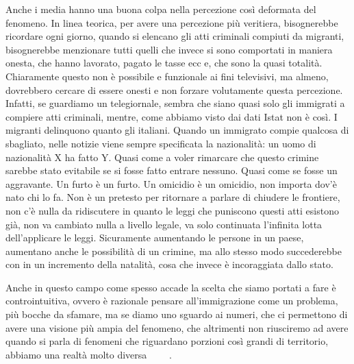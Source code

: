 \documentclass[12pt]{book} %
\begin{document}
Anche i media hanno una buona colpa nella percezione così deformata del fenomeno. In linea teorica, per avere una
percezione più veritiera, bisognerebbe ricordare ogni giorno, quando si elencano gli atti criminali compiuti da
migranti, bisognerebbe menzionare tutti quelli che invece si sono comportati in maniera onesta, che hanno lavorato,
pagato le tasse ecc e, che sono la quasi totalità. Chiaramente questo non è possibile e funzionale ai fini televisivi,
ma almeno, dovrebbero cercare di essere onesti e non forzare volutamente questa percezione. Infatti, se guardiamo un
telegiornale, sembra che siano quasi solo gli immigrati a compiere atti criminali, mentre, come abbiamo visto dai dati
Istat non è così. I migranti delinquono quanto gli italiani. Quando un immigrato compie qualcosa di sbagliato, nelle
notizie viene sempre specificata la nazionalità: un uomo di nazionalità X ha fatto Y. Quasi come a voler rimarcare che
questo crimine sarebbe stato evitabile se si fosse fatto entrare nessuno. Quasi come se fosse un aggravante. Un furto è
un furto. Un omicidio è un omicidio, non importa dov'è nato chi lo fa. Non è un pretesto per
ritornare a parlare di chiudere le frontiere, non c'è nulla da ridiscutere in quanto le leggi che
puniscono questi atti esistono già, non va cambiato nulla a livello legale, va solo continuata
l'infinita lotta dell'applicare le leggi. Sicuramente aumentando le persone
in un paese, aumentano anche le possibilità di un crimine, ma allo stesso modo succederebbe con in un incremento della
natalità, cosa che invece è incoraggiata dallo stato.


\bigskip

Anche in questo campo come spesso accade la scelta che siamo portati a fare è controintuitiva, ovvero è razionale
pensare all'immigrazione come un problema, più bocche da sfamare, ma se diamo uno sguardo ai
numeri, che ci permettono di avere una visione più ampia del fenomeno, che altrimenti non riusciremo ad avere quando si
parla di fenomeni che riguardano porzioni così grandi di territorio, abbiamo una realtà molto
diversa \ \ \ \ .
\end{document}
